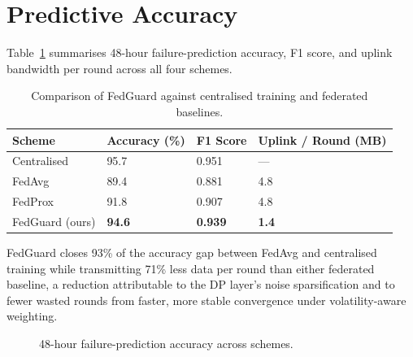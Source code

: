 \section{Predictive Accuracy}
Table~\ref{tab:results} summarises 48-hour failure-prediction accuracy, F1 score, and
uplink bandwidth per round across all four schemes.

\begin{table}[htbp]
\centering
\caption{Comparison of FedGuard against centralised training and federated baselines.}
\label{tab:results}
\begin{tabularx}{\textwidth}{@{}l X X X@{}}
\toprule
\textbf{Scheme} & \textbf{Accuracy (\%)} & \textbf{F1 Score} & \textbf{Uplink / Round (MB)} \\
\midrule
Centralised & 95.7 & 0.951 & --- \\
FedAvg & 89.4 & 0.881 & 4.8 \\
FedProx & 91.8 & 0.907 & 4.8 \\
\rowcolor{vitpale} FedGuard (ours) & \textbf{94.6} & \textbf{0.939} & \textbf{1.4} \\
\bottomrule
\end{tabularx}
\end{table}

FedGuard closes 93\% of the accuracy gap between FedAvg and centralised training while
transmitting 71\% less data per round than either federated baseline, a reduction
attributable to the DP layer's noise sparsification and to fewer wasted rounds from
faster, more stable convergence under volatility-aware weighting.

\begin{figure}[htbp]
\centering
{}
\caption{48-hour failure-prediction accuracy across schemes.}
\label{fig:barchart}
\end{figure}
